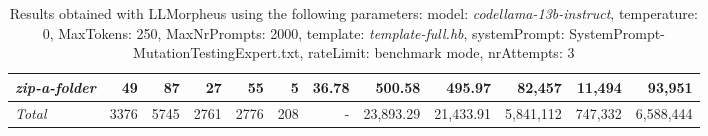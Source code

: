 \begin{table*}
{\begin{tabular}{l||r|r|r|r|r|r||r|r||r|r|r}
   \hline
   \textit{zip-a-folder} & 49 & 87 & 27 & 55 & 5 & 36.78 & 500.58 & 495.97 & 82,457 & 11,494 & 93,951 \\ 
   \hline
   \textit{Total} & 3376 & 5745 & 2761 & 2776 & 208 & - & 23,893.29  & 21,433.91 & 5,841,112 & 747,332 & 6,588,444 \\ 
 \end{tabular}
 }
 \caption{Results obtained with LLMorpheus using the following parameters: 
   model: \textit{codellama-13b-instruct}, 
   temperature: 0, 
   MaxTokens: 250, 
   MaxNrPrompts: 2000, 
   template: \textit{template-full.hb}, 
   systemPrompt: SystemPrompt-MutationTestingExpert.txt, 
   rateLimit: benchmark mode, 
   nrAttempts: 3  
 }
\end{table*}

